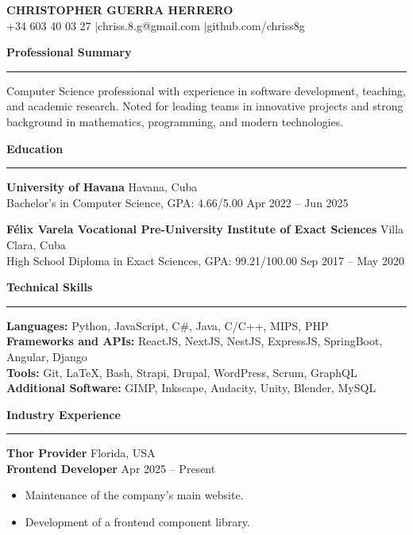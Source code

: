 \documentclass[11pt]{article}
\newcommand{\sectiontitle}[1]{%
	\vspace{30pt}
	{\large \textbf{#1}} \\
	\rule{\linewidth}{0.4pt}
}
\begin{document}
	
	\begin{center}
		{\LARGE \textbf{CHRISTOPHER GUERRA HERRERO}} \\[6pt]
		+34 603 40 03 27 \quad$\vert$\quad chriss.8.g@gmail.com \quad$\vert$\quad github.com/chriss8g \\[6pt]
	\end{center}
	
	\sectiontitle{Professional Summary}
	\vspace{10pt}
	
	Computer Science professional with experience in software development, teaching, and academic research. Noted for leading teams in innovative projects and strong background in mathematics, programming, and modern technologies.
	
	\sectiontitle{Education}
	\vspace{10pt}
	
	\textbf{University of Havana} \hfill Havana, Cuba \\
	Bachelor's in Computer Science, GPA: 4.66/5.00 \hfill Apr 2022 – Jun 2025
	
	\vspace{10pt}
	\textbf{Félix Varela Vocational Pre-University Institute of Exact Sciences} \hfill Villa Clara, Cuba \\
	High School Diploma in Exact Sciences, GPA: 99.21/100.00 \hfill Sep 2017 – May 2020
	
	\sectiontitle{Technical Skills}
	\vspace{10pt}
	
	\textbf{Languages:} Python, JavaScript, C\#, Java, C/C++, MIPS, PHP \\
	\textbf{Frameworks and APIs:} ReactJS, NextJS, NestJS, ExpressJS, SpringBoot, Angular, Django \\
	\textbf{Tools:} Git, LaTeX, Bash, Strapi, Drupal, WordPress, Scrum, GraphQL \\
	\textbf{Additional Software:} GIMP, Inkscape, Audacity, Unity, Blender, MySQL
	
	\sectiontitle{Industry Experience}
	\vspace{10pt}
	
	\textbf{Thor Provider} \hfill Florida, USA \\
	\textbf{Frontend Developer} \hfill Apr 2025 – Present
	\begin{itemize}[left=10pt,itemsep=3pt]
		\item Maintenance of the company’s main website.
		\item Development of a frontend component library.
	\end{itemize}
	
\end{document}
